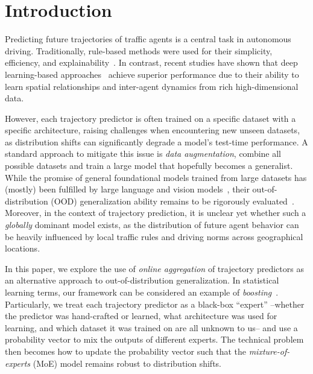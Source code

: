 \section{Introduction}
\label{sec:intro}

Predicting future trajectories of traffic agents is a central task in autonomous driving. Traditionally, rule-based methods were used for their simplicity, efficiency, and explainability~\cite{censi19icra-liability,veer23icra-receding,helou21iros-reasonable}. In contrast, recent studies have shown that deep learning-based approaches~\cite{salzmann20eccv-trajectron++,chen22cvpr-scept,yuan21iccv-agentformer} achieve superior performance due to their ability to learn spatial relationships and inter-agent dynamics from rich high-dimensional data.

However, each trajectory predictor is often trained on a specific dataset with a specific architecture, raising challenges when encountering new unseen datasets, as distribution shifts can significantly degrade a model's test-time performance. A standard approach to mitigate this issue is \emph{data augmentation}, \ie combine all possible datasets and train a large model that hopefully becomes a generalist. While the promise of general foundational models trained from large datasets has (mostly) been fulfilled by large language and vision models~\cite{bommasani21arxiv-opportunities}, their out-of-distribution (OOD) generalization ability remains to be rigorously evaluated~\cite{wang2023decodingtrust,nguyen2023out,liu2024survey}. Moreover, in the context of trajectory prediction, it is unclear yet whether such a \emph{globally} dominant model exists, as the distribution of future agent behavior can be heavily influenced by local traffic rules and driving norms across geographical locations.

In this paper, we explore the use of \emph{online aggregation} of trajectory predictors as an alternative approach to out-of-distribution generalization. In statistical learning terms, our framework can be considered an example of \emph{boosting}~\cite{schapire99ijcai-brief,meir03ml-introduction}.  Particularly, we treat each trajectory predictor as a black-box ``expert'' --whether the predictor was hand-crafted or learned, what architecture was used for learning, and which dataset it was trained on are all unknown to us-- and use a probability vector to mix the outputs of different experts. The technical problem then becomes how to update the probability vector such that the \emph{mixture-of-experts} (MoE) model remains robust to distribution shifts.


